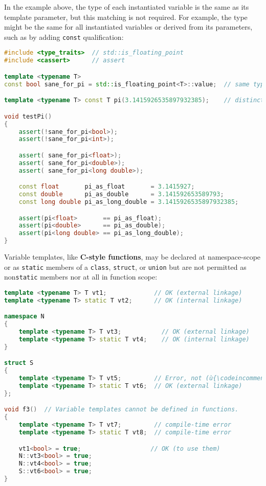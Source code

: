 \noindent In the example above, the type of each instantiated variable is the same as its template parameter, but this matching is not required. For example, the type might be the same for all instantiated variables or derived from its parameters, such as by adding \lstinline!const! qualification:

\begin{lstlisting}[language=C++]
#include <type_traits>  // std::is_floating_point
#include <cassert>      // assert

template <typename T>
const bool sane_for_pi = std::is_floating_point<T>::value;  // same type

template <typename T> const T pi(3.1415926535897932385);    // distinct types

void testPi()
{
    assert(!sane_for_pi<bool>);
    assert(!sane_for_pi<int>);

    assert( sane_for_pi<float>);
    assert( sane_for_pi<double>);
    assert( sane_for_pi<long double>);

    const float       pi_as_float       = 3.1415927;
    const double      pi_as_double      = 3.141592653589793;
    const long double pi_as_long_double = 3.1415926535897932385;

    assert(pi<float>       == pi_as_float);
    assert(pi<double>      == pi_as_double);
    assert(pi<long double> == pi_as_long_double);
}
\end{lstlisting}

\noindent Variable templates, like \textbf{C-style functions}, may be declared at
namespace-scope or as \texttt{static} members of a
\texttt{class}, \texttt{struct}, or \texttt{union} but are not
permitted as non\texttt{static} members nor at all in function scope:

\begin{lstlisting}[language=C++]
template <typename T> T vt1;             // OK (external linkage)
template <typename T> static T vt2;      // OK (internal linkage)

namespace N
{
    template <typename T> T vt3;           // OK (external linkage)
    template <typename T> static T vt4;    // OK (internal linkage)
}

struct S
{
    template <typename T> T vt5;         // Error, not (ù{\codeincomments{static}}ù)
    template <typename T> static T vt6;  // OK (external linkage)
};

void f3()  // Variable templates cannot be defined in functions.
{
    template <typename T> T vt7;         // compile-time error
    template <typename T> static T vt8;  // compile-time error

    vt1<bool> = true;                   // OK (to use them)
    N::vt3<bool> = true;
    N::vt4<bool> = true;
    S::vt6<bool> = true;
}
\end{lstlisting}

